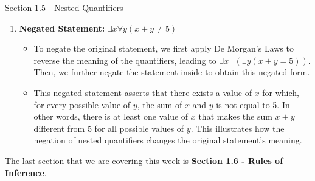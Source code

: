 \begin{notes}{Section 1.5 - Nested Quantifiers}
\begin{Highlight}
\begin{enumerate}
            \item \textbf{Negated Statement:} \(\exists x \forall y (x + y \neq 5)\)
            \begin{itemize}
                \item To negate the original statement, we first apply De Morgan's Laws to reverse the meaning of the quantifiers, leading to \(\exists x \neg(\exists y (x + y = 5))\). Then, we further negate the statement inside to obtain this negated form.
                \item This negated statement asserts that there exists a value of \(x\) for which, for every possible value of \(y\), the sum of \(x\) and \(y\) is not equal to 5. In other words, there is at least one value of \(x\) that makes the sum \(x + y\) different from 5 
                for all possible values of \(y\). This illustrates how the negation of nested quantifiers changes the original statement's meaning.
            \end{itemize}
        \end{enumerate}
    \end{Highlight}
\end{notes}

The last section that we are covering this week is \textbf{Section 1.6 - Rules of Inference}.

